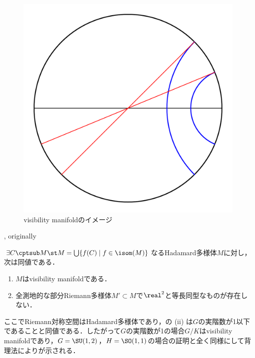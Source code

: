 \begin{figure}[H]
  \centering
  \includegraphics[scale=0.3]{../graph/visibility.pdf}
  \caption{visibility manifoldのイメージ}
  \label{fig:visibility}
\end{figure}


\begin{thm}{\cite[p.~296, 9.33~Theorem]{bh99}, originally \cite[Theorem~4.1]{e72-2}}\label{thm:visibility-and-rank}
  
  $\exists C\cptsub M\st M = \bigcup\{f(C)\mid f\in \isom(M) \}  $なるHadamard多様体$M$に対し，次は同値である．
  \vspace{-1em}
  \begin{enumerate}
    \renewcommand{\labelenumi}{(\roman{enumi})}
  \item $M$はvisibility manifoldである．
  \item 全測地的な部分Riemann多様体$M'\subset M$で$\real^2$と等長同型なものが存在しない．
  \end{enumerate}
\end{thm}

ここでRiemann対称空間はHadamard多様体であり，の (ii) は$G$の実階数が1以下であることと同値である．したがって$G$の実階数が1の場合$G/K$はvisibility manifoldであり，$G = \SU(1,2) $，$H= \SO(1,1)$の場合の証明と全く同様にして背理法によりが示される．

